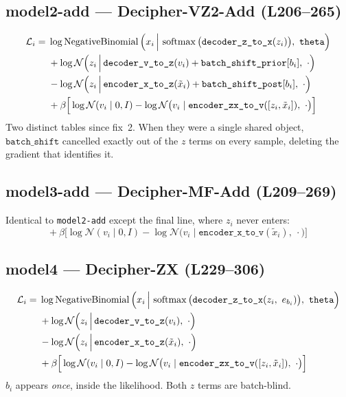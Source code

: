 \documentclass[11pt]{article}
\newcommand{\encxz}{\texttt{encoder\_x\_to\_z}}
\newcommand{\enczxv}{\texttt{encoder\_zx\_to\_v}}
\newcommand{\encxv}{\texttt{encoder\_x\_to\_v}}
\newcommand{\decvz}{\texttt{decoder\_v\_to\_z}}
\newcommand{\deczx}{\texttt{decoder\_z\_to\_x}}
\newcommand{\bshift}{\texttt{batch\_shift}}
\newcommand{\bprior}{\texttt{batch\_shift\_prior}}
\newcommand{\bpost}{\texttt{batch\_shift\_post}}
\newcommand{\thetapar}{\texttt{theta}}
\newcommand{\smax}{\operatorname{softmax}}
\newcommand{\NB}{\operatorname{NegativeBinomial}}
\newcommand{\Norm}{\mathcal{N}}
\begin{document}
\subsection*{model2-add --- Decipher-VZ2-Add \hfill\normalfont\small(L206--265)}
\begin{align}
\mathcal{L}_i =\;& \log \NB\Big(x_i \,\Big|\, \smax\big(\deczx(z_i)\big),\ \thetapar\Big) \notag\\
&+ \log \Norm\Big(z_i \,\Big|\, \decvz(v_i) + \bprior[b_i],\ \cdot\Big) \notag\\
&- \log \Norm\Big(z_i \,\Big|\, \encxz(\tilde{x}_i) + \bpost[b_i],\ \cdot\Big) \notag\\
&+ \beta\Big[\log \Norm(v_i \mid 0, I) - \log \Norm\big(v_i \mid \enczxv([z_i,\tilde{x}_i]),\ \cdot\big)\Big]
\end{align}
Two distinct tables since fix~2. When they were a single shared object, $\bshift$ cancelled
exactly out of the $z$ terms on every sample, deleting the gradient that identifies it.

\subsection*{model3-add --- Decipher-MF-Add \hfill\normalfont\small(L209--269)}
Identical to \texttt{model2-add} except the final line, where $z_i$ never enters:
\begin{equation}
+\ \beta\Big[\log \Norm(v_i \mid 0, I) - \log \Norm\big(v_i \mid \encxv(\tilde{x}_i),\ \cdot\big)\Big]
\end{equation}

\subsection*{model4 --- Decipher-ZX \hfill\normalfont\small(L229--306)}
\begin{align}
\mathcal{L}_i =\;& \log \NB\Big(x_i \,\Big|\, \smax\big(\deczx(z_i,\ e_{b_i})\big),\ \thetapar\Big) \notag\\
&+ \log \Norm\Big(z_i \,\Big|\, \decvz(v_i),\ \cdot\Big) \notag\\
&- \log \Norm\Big(z_i \,\Big|\, \encxz(\tilde{x}_i),\ \cdot\Big) \notag\\
&+ \beta\Big[\log \Norm(v_i \mid 0, I) - \log \Norm\big(v_i \mid \enczxv([z_i,\tilde{x}_i]),\ \cdot\big)\Big]
\end{align}
$b_i$ appears \emph{once}, inside the likelihood. Both $z$ terms are batch-blind.
\end{document}
